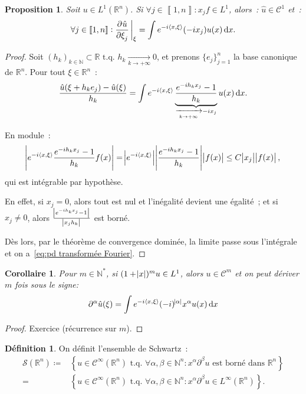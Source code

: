 \documentclass{report}
\newcommand{\R}{{\mathbb R}}
\newcommand{\N}{{\mathbb N}}
\newcommand{\scpr}[2]{\left\langle#1, #2\right\rangle}
\newcommand{\tq}{\text{ t.q. }}
\newcommand{\pinfty}{{+\infty}}
\newcommand{\intint}[2]{{\left\llbracket#1, #2\right\rrbracket}}
\newtheorem{prp}[thm]{Proposition}
\newtheorem{cor}[thm]{Corollaire}
\theoremstyle{definition}
\newtheorem{déf}[thm]{Définition}
\theoremstyle{remark}
\begin{document}
\begin{prp} Soit $u \in L^1(\R^n)$. Si $\forall j \in \intint 1n : x_jf \in L^1$, alors~: $\hat u \in \mathcal C^1$ et~:
\begin{equation}\label{eq:pd transformée Fourier}
	\forall j \in \intint 1n : \dpd {\hat u}{\xi_j}\sVert[3]_\xi = \int e^{-i\scpr x\xi}(-ix_j)u(x)\dif x.
\end{equation}
\end{prp}

\begin{proof} Soit $(h_k)_{k \in \N} \subset \R \tq h_k \xrightarrow[k \to \pinfty]{} 0$, et prenons $\{e_j\}_{j=1}^n$ la base canonique de $\R^n$. Pour tout $\xi \in \R^n$~:
\[\frac {\hat u(\xi + h_ke_j) - \hat u(\xi)}{h_k} = \int e^{-i\scpr x\xi}\underbrace {\frac {e^{-ih_kx_j}-1}{h_k}}_{\xrightarrow[k \to \pinfty]{} -ix_j}u(x)\dif x.\]

En module~:
\[\abs {e^{-i\scpr x\xi}\frac {e^{-ih_kx_j}-1}{h_k}f(x)} = \abs {e^{-i\scpr x\xi}}\abs {\frac {e^{-ih_kx_j}-1}{h_k}}\abs {f(x)} \leq C\abs {x_j}\abs {f(x)},\]
qui est intégrable par hypothèse.

En effet, si $x_j = 0$, alors tout est nul et l'inégalité devient une égalité~; et si $x_j \neq 0$, alors $\frac {\abs {e^{-ih_kx_j}-1}}{\abs {x_jh_k}}$ est borné.

Dès lors, par le théorème de convergence dominée, la limite passe sous l'intégrale et on a~\eqref{eq:pd transformée Fourier}.
\end{proof}

\begin{cor} Pour $m \in \N^*$, si $(1+\abs x)^mu \in L^1$, alors $u \in \mathcal C^m$ et on peut dériver $m$ fois sous le signe:
\[\partial^\alpha\hat u(\xi) = \int e^{-i\scpr x\xi}(-i)^{\abs \alpha}x^\alpha u(x)\dif x\]
\end{cor}

\begin{proof} Exercice (récurrence sur $m$).
\end{proof}

\begin{déf} On définit l'ensemble de Schwartz~:
\begin{equation}\begin{aligned}
	\mathcal S(\R^n) \coloneqq &\left\{u \in \mathcal C^\infty(\R^n) \tq \forall \alpha, \beta \in \N^n : x^\alpha\partial^\beta u \text{ est borné dans } \R^n\right\} \\
		= &\left\{u \in \mathcal C^\infty(\R^n) \tq \forall \alpha, \beta \in \N^n : x^\alpha\partial^\beta u \in L^\infty(\R^n)\right\}.
\end{aligned}\end{equation}
\end{déf}
\end{document}
